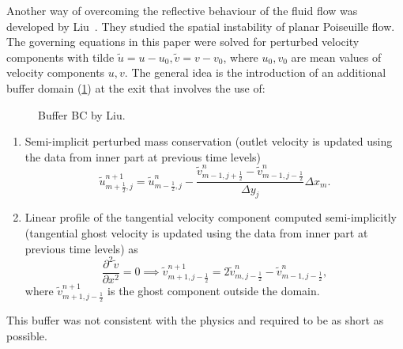 \documentclass{article}
\numberwithin{equation}{section}
\begin{document}
Another way of overcoming the reflective behaviour of the fluid flow was developed by Liu~\cite{Liu:1993}. They studied the spatial instability of planar Poiseuille flow. The governing equations in this paper were solved for perturbed velocity components with tilde $\tilde{u}=u-u_0,\tilde{v}=v-v_0$, where $u_0,v_0$ are mean values of velocity components $u,v$. The general idea is the introduction of an additional buffer domain (\cref{fig:BC-buffer}) at the exit that involves the use of:
\begin{figure}[H] %
  \caption{Buffer BC by Liu.}\label{fig:BC-buffer}
\end{figure}
\begin{enumerate}
	\item Semi-implicit perturbed mass conservation (outlet velocity is updated using the data from inner part at previous time levels)
	\begin{equation*}
		\tilde{u}_{m+\frac{1}{2},j}^{n+1}=\tilde{u}_{m-\frac{1}{2},j}^n-\frac{\tilde{v}^n_{m-1,j+\frac{1}{2}}-\tilde{v}^n_{m-1,j-\frac{1}{2}}}{\Delta y_{j}}{\Delta x_m}.
	\end{equation*}
	\item Linear profile of the tangential velocity component computed semi-implicitly (tangential ghost velocity is updated using the data from inner part at previous time levels) as
	\begin{equation*}
		\frac{\partial ^2 \tilde{v}}{\partial x^2}=0\implies \tilde{v}^{n+1}_{m+1,j-\frac{1}{2}}=2\tilde{v}^n_{m,j-\frac{1}{2}}-\tilde{v}^n_{m-1,j-\frac{1}{2}},
	\end{equation*}
	where $\tilde{v}^{n+1}_{m+1,j-\frac{1}{2}}$ is the ghost component outside the domain.
\end{enumerate}
This buffer was not consistent with the physics and required to be as short as possible. 
\end{document}
